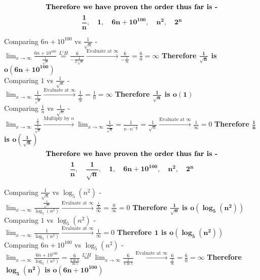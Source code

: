 \documentclass[9pt]{article}
\begin{document}
$$\text{\textbf{Therefore we have proven the order thus far is -}} $$
$$\mathbf{\frac{1}{n},\quad 1 ,\quad 6n+10^{100},\quad n^2,\quad 2^n}$$

Comparing $6n+10^{100}$ vs $\frac{1}{\sqrt n}$ - \\
$ \displaystyle \lim_{x \to \infty} \frac{6n+10^{100}}{\frac{1}{\sqrt n}} \stackrel{L'H}{=} \frac{6}{-\frac{1}{2 \sqrt[3]{n}}} \stackrel{\text{Evaluate at }\infty}{\rightarrow} \frac{6}{-\frac{1}{\infty}} =  \frac{6}{0} = \infty$ \hfill \textbf{Therefore $\mathbf{\frac{1}{\sqrt n}}$ is $\mathbf{o(6n+10^{100})}$}\\
Comparing $1$ vs $\frac{1}{\sqrt n}$ - \\
$ \displaystyle \lim_{x \to \infty} \frac{1}{\frac{1}{\sqrt n}} \stackrel{\text{Evaluate at }\infty}{\rightarrow} \frac{1}{\frac{1}{\infty}} =  \frac{1}{0} = \infty$ \hfill \textbf{Therefore $\mathbf{\frac{1}{\sqrt n}}$ is $\mathbf{o(1)}$}\\
Comparing $\frac{1}{n}$ vs $\frac{1}{\sqrt n}$ - \\
$ \displaystyle \lim_{x \to \infty} \frac{\frac{1}{n}}{\frac{1}{\sqrt n}} \stackrel{\text{Multiply by }n}{\rightarrow} \lim_{x \to \infty} \frac{1}{\frac{n}{\sqrt n}} = \frac{1}{n \cdot n^{-\frac{1}{2}}} = \frac{1}{\sqrt{n}} \stackrel{\text{Evaluate at }\infty}{\rightarrow} \frac{1}{\infty} = 0$ \hfill \textbf{Therefore $\mathbf{\frac{1}{n}}$ is $\mathbf{o(\frac{1}{\sqrt n})}$}\\

$$\text{\textbf{Therefore we have proven the order thus far is -}} $$
$$\mathbf{\frac{1}{n},\quad \frac{1}{\sqrt n} ,\quad 1 ,\quad 6n+10^{100},\quad n^2,\quad 2^n}$$

Comparing $\frac{1}{\sqrt n}$ vs $\log_5 (n^2)$ - \\
$ \displaystyle \lim_{x \to \infty} \frac{\frac{1}{\sqrt n}}{\log_5 (n^2)} \stackrel{\text{Evaluate at }\infty}{\rightarrow} \frac{\frac{1}{\infty}}{\infty} =  \frac{0}{\infty} = 0$ \hfill \textbf{Therefore $\mathbf{\frac{1}{\sqrt n}}$ is $\mathbf{o(\log_5 (n^2))}$}\\
Comparing $1$ vs $\log_5 (n^2)$ - \\
$ \displaystyle \lim_{x \to \infty} \frac{1}{\log_5 (n^2)} \stackrel{\text{Evaluate at }\infty}{\rightarrow} \frac{1}{\infty} = 0$ \hfill \textbf{Therefore $\mathbf{1}$ is $\mathbf{o(\log_5 (n^2))}$}\\
Comparing $6n+10^{100}$ vs $\log_5 (n^2)$ - \\
$ \displaystyle \lim_{x \to \infty} \frac{6n+10^{100}}{\log_5 (n^2)} = \frac{6}{\frac{2 \ln n}{\ln 5}} \stackrel{L'H}{=} \lim_{x \to \infty} \frac{6}{\frac{2}{n\ln 5}} \stackrel{\text{Evaluate at }\infty}{\rightarrow} \frac{6}{\frac{2}{\infty}} = \frac{6}{0} = \infty$ \; \textbf{Therefore $\mathbf{\log_5 (n^2)}$ is $\mathbf{o(6n+10^{100})}$}\\
\end{document}

